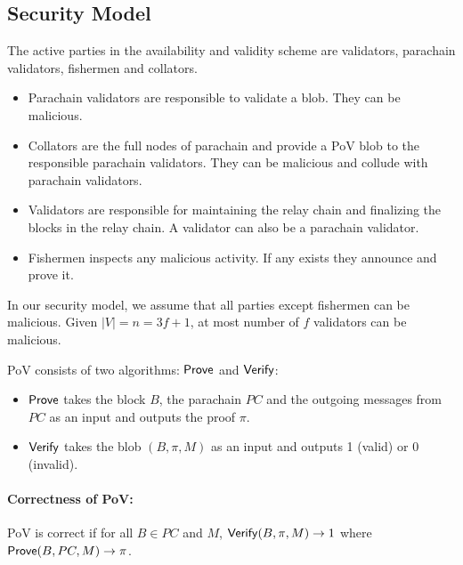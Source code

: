 \subsection{Security Model}



The active parties in the availability and validity scheme are validators, parachain validators, fishermen and collators. 




\begin{itemize}

\item Parachain validators are responsible to validate a blob. They can be malicious.
\item Collators are the full nodes of parachain and provide a PoV blob to the responsible parachain validators. They can be malicious and collude with parachain validators.
\item Validators are responsible for maintaining the relay chain and finalizing the blocks in the relay chain. A validator can also be a parachain validator. 
\item Fishermen inspects any malicious activity. If any exists they announce and prove it.  



\end{itemize}

In our security model, we assume that all parties except fishermen can be malicious. Given $|V| = n = 3f + 1$, at most number of $f$ validators can be malicious.


\begin{definition}\label{def:pob}
PoV consists of two algorithms: $\mathsf{Prove}$ and $\mathsf{Verify}$:
\begin{itemize}
    \item $\mathsf{Prove}$  takes the block $B$, the parachain $PC$ and the outgoing messages from $PC$ as an input and outputs the proof $\pi$.
    \item $\mathsf{Verify}$  takes the blob $(B,\pi,M)$ as an input and outputs 1 (valid) or 0 (invalid).
\end{itemize}
\end{definition}
\paragraph{Correctness of PoV:} PoV is correct if for all $B \in PC$ and $M$, $\mathsf{Verify}(B,\pi,M)\rightarrow 1$ where $\mathsf{Prove}(B, PC,M)\rightarrow \pi$.


